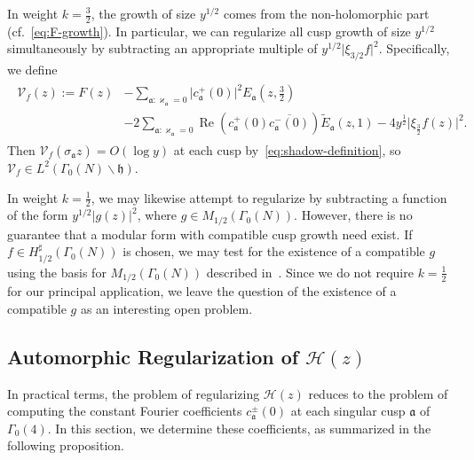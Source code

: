 \documentclass[11pt,reqno]{amsart}
\theoremstyle{plain}
\theoremstyle{definition}
\numberwithin{equation}{section}
\renewcommand{\Re}{\operatorname{Re}}
\begin{document}
In weight $k =\frac{3}{2}$, the growth of size $y^{1/2}$ comes from the non-holomorphic part (cf.~\eqref{eq:F-growth}). In particular, we can regularize all cusp growth of size $y^{1/2}$ simultaneously by subtracting an appropriate multiple of $y^{1/2} \vert \xi_{3/2} f \vert^2$. Specifically, we define
\begin{align} \label{eq:regularization-3/2}
\begin{split} 
	\mathcal{V}_f(z) := F(z) 
		& - \sum_{\mathfrak{a} : \varkappa_\mathfrak{a} = 0}
			\vert c_\mathfrak{a}^+(0) \vert^2 E_\mathfrak{a}(z,\tfrac{3}{2}) \\
		& - 2\sum_{\mathfrak{a} : \varkappa_\mathfrak{a} = 0}
			\Re ( c_\mathfrak{a}^+(0) \overline{c_\mathfrak{a}^-(0)})
				\widetilde{E}_\mathfrak{a}(z,1)
		- 4y^{\frac{1}{2}} \vert \xi_{\frac{3}{2}} f(z) \vert^2.
\end{split}
\end{align}
Then $\mathcal{V}_f(\sigma_{\mathfrak{a}} z) = O(\log y)$ at each cusp by~\eqref{eq:shadow-definition}, so $\mathcal{V}_f \in L^2(\Gamma_0(N) \backslash \mathfrak{h})$.

In weight $k=\frac{1}{2}$, we may likewise attempt to regularize by subtracting a function of the form $y^{1/2} \vert g(z) \vert^2$, where $g \in M_{1/2}(\Gamma_0(N))$. However, there is no guarantee that a modular form with compatible cusp growth need exist. If $f \in H_{1/2}^\sharp(\Gamma_0(N))$ is chosen, we may test for the existence of a compatible $g$ using the basis for $M_{1/2}(\Gamma_0(N))$ described in~\cite[Theorem A]{SerreStark77}. Since we do not require $k=\frac{1}{2}$ for our principal application, we leave the question of the existence of a compatible $g$ as an interesting open problem.

\subsection{Automorphic Regularization of \texorpdfstring{$\mathcal{H}(z)$}{H(z)}} 

In practical terms, the problem of regularizing $\mathcal{H}(z)$ reduces to the problem of computing the constant Fourier coefficients $c_\mathfrak{a}^\pm(0)$ at each singular cusp $\mathfrak{a}$ of $\Gamma_0(4)$. In this section, we determine these coefficients, as summarized in the following proposition.
\end{document}
